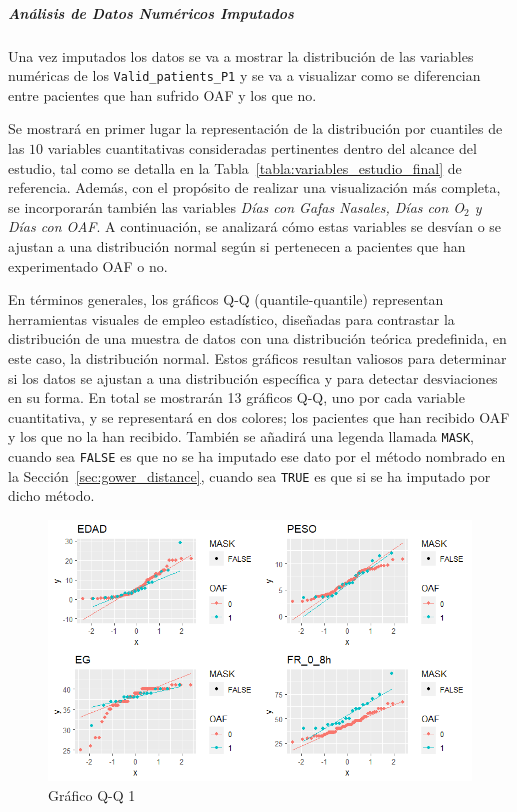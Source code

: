 \subparagraph{Análisis de Datos Numéricos Imputados}

Una vez imputados los datos se va a mostrar la distribución de las variables numéricas de los \texttt{Valid\_patients\_P1} y se va a visualizar como se diferencian entre pacientes que han sufrido OAF y los que no. 

Se mostrará en primer lugar la representación de la distribución por cuantiles de las $10$ variables cuantitativas consideradas pertinentes dentro del alcance del estudio, tal como se detalla en la Tabla~\ref{tabla:variables_estudio_final} de referencia. Además, con el propósito de realizar una visualización más completa, se incorporarán también las variables \textit{Días con Gafas Nasales, Días con O$_2$ y Días con OAF}. A continuación, se analizará cómo estas variables se desvían o se ajustan a una distribución normal según si pertenecen a pacientes que han experimentado OAF o no.

En términos generales, los gráficos Q-Q (quantile-quantile) representan herramientas visuales de empleo estadístico, diseñadas para contrastar la distribución de una muestra de datos con una distribución teórica predefinida, en este caso, la distribución normal. Estos gráficos resultan valiosos para determinar si los datos se ajustan a una distribución específica y para detectar desviaciones en su forma. En total se mostrarán 13 gráficos Q-Q, uno por cada variable cuantitativa, y se representará en dos colores; los pacientes que han recibido OAF y los que no la han recibido. También se añadirá una legenda llamada \texttt{MASK}, cuando sea \texttt{FALSE} es que no se ha imputado ese dato por el método nombrado en la Sección~\ref{sec:gower_distance}, cuando sea \texttt{TRUE} es que si se ha imputado por dicho método.

\begin{figure}[H]
    \centering
    \includegraphics[scale = 1]{./img/qq1.png}
    \caption{Gráfico Q-Q 1}\label{fig:qq1}
\end{figure}

